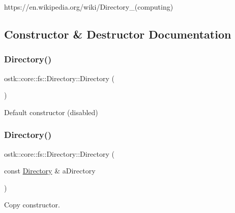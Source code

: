 https\+://en.wikipedia.\+org/wiki/\+Directory\+\_\+(computing) 

\subsection{Constructor \& Destructor Documentation}
\mbox{\label{classostk_1_1core_1_1fs_1_1_directory_adc893e10f55282be0d0455e9cfc5796b}} 
\subsubsection{\texorpdfstring{Directory()}{Directory()}\hspace{0.1cm}{\footnotesize\ttfamily [1/2]}}
{\footnotesize\ttfamily ostk\+::core\+::fs\+::\+Directory\+::\+Directory (\begin{DoxyParamCaption}{ }\end{DoxyParamCaption})\hspace{0.3cm}{\ttfamily [delete]}}



Default constructor (disabled) 

\mbox{\label{classostk_1_1core_1_1fs_1_1_directory_a7efd6dd990b63a84f9ac5844005623bc}} 
\subsubsection{\texorpdfstring{Directory()}{Directory()}\hspace{0.1cm}{\footnotesize\ttfamily [2/2]}}
{\footnotesize\ttfamily ostk\+::core\+::fs\+::\+Directory\+::\+Directory (\begin{DoxyParamCaption}\item[{const \hyperlink{classostk_1_1core_1_1fs_1_1_directory}{Directory} \&}]{a\+Directory }\end{DoxyParamCaption})\hspace{0.3cm}{\ttfamily [default]}}



Copy constructor. 


